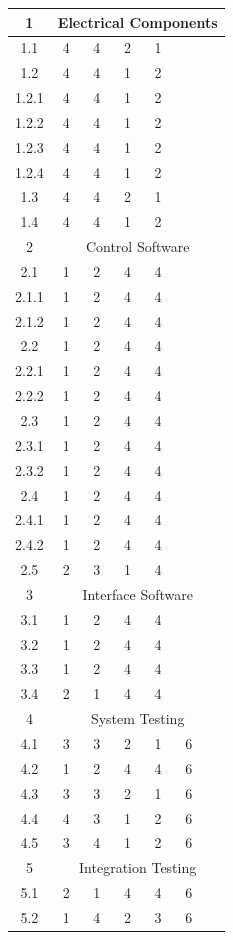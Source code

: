 \begin{longtable}{|c|c|c|c|c|c|c|}
	\hline 1 & \multicolumn{6}{c|}{Electrical Components} \\ \hline
	1.1  &4&4&2&1&  \\ \hline
	1.2  &4&4&1&2&  \\ \hline
	1.2.1&4&4&1&2&  \\ \hline
	1.2.2 &4&4&1&2&  \\ \hline
	1.2.3 &4&4&1&2&  \\ \hline
	1.2.4 &4&4&1&2&  \\ \hline
	1.3  &4&4&2&1&\\ \hline
	1.4  &4&4&1&2&   \\ \hline
	\hline 2 & \multicolumn{6}{c|}{Control Software} \\ \hline
	2.1  &1&2&4&4&   \\ \hline
	2.1.1 &1&2&4&4 &  \\ \hline
	2.1.2 &1&2&4&4&  \\ \hline
	2.2  &1&2&4&4& \\ \hline
	2.2.1 &1&2&4&4&   \\ \hline
	2.2.2 &1&2&4&4&   \\ \hline
	2.3 &1&2&4&4& \\ \hline
	2.3.1 &1&2&4&4&  \\ \hline
	2.3.2 &1&2&4&4&  \\ \hline
	2.4  &1&2&4&4&\\ \hline
	2.4.1 &1&2&4&4& \\ \hline
	2.4.2 &1&2&4&4& \\ \hline
	2.5 &2&3&1&4& \\ \hline
	\hline 3 & \multicolumn{6}{c|}{Interface Software} \\ \hline
	3.1  &1& 2&4 &4 & \\ \hline
	3.2  &1& 2& 4& 4& \\ \hline
	3.3 & 1&2& 4& 4& \\ \hline
	3.4  &2&1 & 4&4 &\\ \hline
	\hline 4 & \multicolumn{6}{c|}{System Testing} \\ \hline
	4.1  &3&3&2&1&6\\ \hline
	4.2  &1&2&4&4&6\\ \hline
	4.3  &3&3&2&1&6\\ \hline
	4.4  &4&3&1&2&6\\ \hline
	4.5  &3&4&1&2&6\\ \hline
	\hline 5 & \multicolumn{6}{c|}{Integration Testing} \\ \hline
	5.1  &2&1&4&4&6\\ \hline
	5.2  &1&4&2&3&6\\ \hline

\end{longtable}
